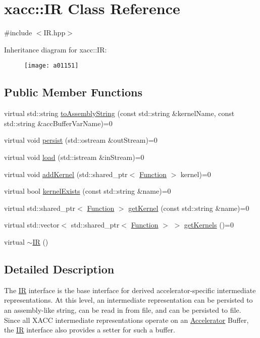 \hypertarget{a01151}{}\section{xacc\+:\+:IR Class Reference}
\label{a01151}


{\ttfamily \#include $<$I\+R.\+hpp$>$}

Inheritance diagram for xacc\+:\+:IR\+:\begin{figure}[H]
\begin{center}
\leavevmode
\texttt{[image: a01151]}
\end{center}
\end{figure}
\subsection*{Public Member Functions}
\begin{DoxyCompactItemize}
\item 
virtual std\+::string \hyperlink{a01151_a8356cdff1919b88eabeb84fd7450cdb6}{to\+Assembly\+String} (const std\+::string \&kernel\+Name, const std\+::string \&acc\+Buffer\+Var\+Name)=0
\item 
virtual void \hyperlink{a01151_a414b72224d88473ad6190bb88102a3ea}{persist} (std\+::ostream \&out\+Stream)=0
\item 
virtual void \hyperlink{a01151_a444c2e4dc0faac500fb70fa93997e9bc}{load} (std\+::istream \&in\+Stream)=0
\item 
virtual void \hyperlink{a01151_abbbf8e6993c518597de32cd05d49d737}{add\+Kernel} (std\+::shared\+\_\+ptr$<$ \hyperlink{a01127}{Function} $>$ kernel)=0
\item 
virtual bool \hyperlink{a01151_afc9ccf5126f3fed19c2e879133b2f6d8}{kernel\+Exists} (const std\+::string \&name)=0
\item 
virtual std\+::shared\+\_\+ptr$<$ \hyperlink{a01127}{Function} $>$ \hyperlink{a01151_a6f49b4ba4b3a15142b04873284885f0d}{get\+Kernel} (const std\+::string \&name)=0
\item 
virtual std\+::vector$<$ std\+::shared\+\_\+ptr$<$ \hyperlink{a01127}{Function} $>$ $>$ \hyperlink{a01151_a88c50bfc5b279145360ddc0c3a703b9b}{get\+Kernels} ()=0
\item 
virtual \hyperlink{a01151_a09a76d71092254acae07e19fa2f34921}{$\sim$\+IR} ()
\end{DoxyCompactItemize}


\subsection{Detailed Description}
The \hyperlink{a01151}{IR} interface is the base interface for derived accelerator-\/specific intermediate representations. At this level, an intermediate representation can be persisted to an assembly-\/like string, can be read in from file, and can be persisted to file. Since all X\+A\+CC intermediate representations operate on an \hyperlink{a01087}{Accelerator} Buffer, the \hyperlink{a01151}{IR} interface also provides a setter for such a buffer. 

